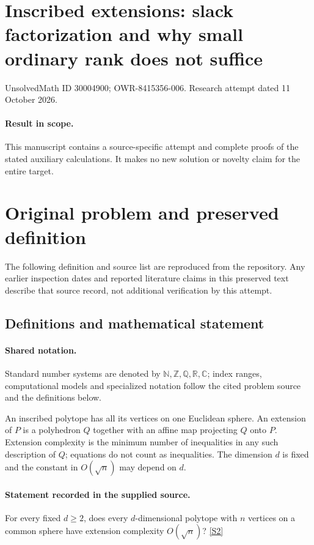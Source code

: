 \documentclass[11pt]{article}
\begin{document}
\section*{Inscribed extensions: slack factorization and why small ordinary rank does not suffice}
\noindent UnsolvedMath ID 30004900; OWR-8415356-006. Research attempt dated 11 October 2026.
\paragraph{Result in scope.}This manuscript contains a source-specific attempt and complete proofs of the stated auxiliary calculations. It makes no new solution or novelty claim for the entire target.
\section{Original problem and preserved definition}
The following definition and source list are reproduced from the repository. Any earlier inspection dates and reported literature claims in this preserved text describe that source record, not additional verification by this attempt.
\subsection{Definitions and mathematical statement}

\paragraph{Shared notation.}Standard number systems are denoted by $\mathbb N,\mathbb Z,\mathbb Q,\mathbb R,\mathbb C$; index ranges, computational models and specialized notation follow the cited problem source and the definitions below.


An inscribed polytope has all its vertices on one Euclidean sphere. An extension of $P$ is a polyhedron $Q$ together with an affine map projecting $Q$ onto $P$. Extension complexity is the minimum number of inequalities in any such description of $Q$; equations do not count as inequalities. The dimension $d$ is fixed and the constant in $O(\sqrt n)$ may depend on $d$.
\paragraph{Statement recorded in the supplied source.}
For every fixed $d\geq2$, does every $d$-dimensional polytope with $n$ vertices on a common sphere have extension complexity $O(\sqrt n)$? \href{https://doi.org/10.4171/owr/2021/53}{[S2]}
\end{document}
